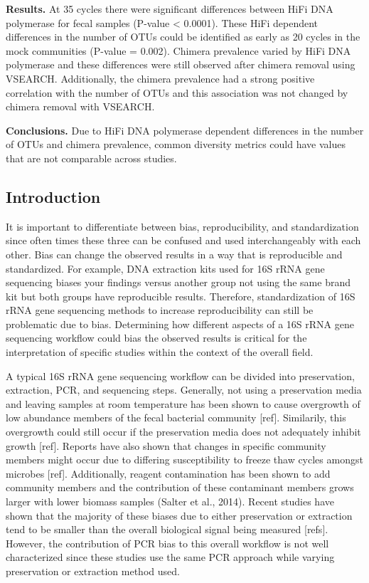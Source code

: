 \documentclass[12pt,]{article}
\begin{document}
\textbf{Results.} At 35 cycles there were significant differences
between HiFi DNA polymerase for fecal samples (P-value \textless{}
0.0001). These HiFi dependent differences in the number of OTUs could be
identified as early as 20 cycles in the mock communities (P-value =
0.002). Chimera prevalence varied by HiFi DNA polymerase and these
differences were still observed after chimera removal using VSEARCH.
Additionally, the chimera prevalence had a strong positive correlation
with the number of OTUs and this association was not changed by chimera
removal with VSEARCH.

\textbf{Conclusions.} Due to HiFi DNA polymerase dependent differences
in the number of OTUs and chimera prevalence, common diversity metrics
could have values that are not comparable across studies.

\newpage

\subsection{Introduction}\label{introduction}

It is important to differentiate between bias, reproducibility, and
standardization since often times these three can be confused and used
interchangeably with each other. Bias can change the observed results in
a way that is reproducible and standardized. For example, DNA extraction
kits used for 16S rRNA gene sequencing biases your findings versus
another group not using the same brand kit but both groups have
reproducible results. Therefore, standardization of 16S rRNA gene
sequencing methods to increase reproducibility can still be problematic
due to bias. Determining how different aspects of a 16S rRNA gene
sequencing workflow could bias the observed results is critical for the
interpretation of specific studies within the context of the overall
field.

A typical 16S rRNA gene sequencing workflow can be divided into
preservation, extraction, PCR, and sequencing steps. Generally, not
using a preservation media and leaving samples at room temperature has
been shown to cause overgrowth of low abundance members of the fecal
bacterial community {[}ref{]}. Similarily, this overgrowth could still
occur if the preservation media does not adequately inhibit growth
{[}ref{]}. Reports have also shown that changes in specific community
members might occur due to differing susceptibility to freeze thaw
cycles amongst microbes {[}ref{]}. Additionally, reagent contamination
has been shown to add community members and the contribution of these
contaminant members grows larger with lower biomass samples (Salter et
al., 2014). Recent studies have shown that the majority of these biases
due to either preservation or extraction tend to be smaller than the
overall biological signal being measured {[}refs{]}. However, the
contribution of PCR bias to this overall workflow is not well
characterized since these studies use the same PCR approach while
varying preservation or extraction method used.
\end{document}
